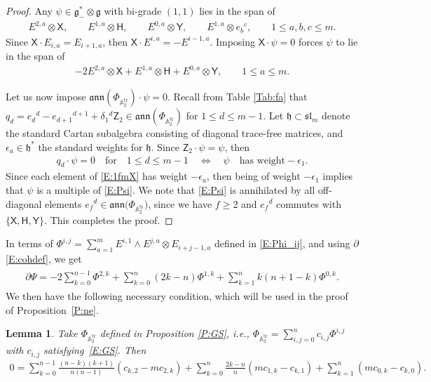 \documentclass[10pt,a4paper]{amsart}
\newcommand\tensor{\otimes}
\DeclareMathOperator{\tr}{tr}
\newcommand{\fh}{\mathfrak{h}}
\newcommand\fann{\mathfrak{ann}}
\newcommand\fg{\mathfrak{g}}
\newcommand\fsl{\mathfrak{sl}}
\newcommand\bbA{\mathbb{A}}
\newcommand\sfX{\mathsf{X}}
\newcommand\sfH{\mathsf{H}}
\newcommand\sfY{\mathsf{Y}}
\newcommand\sfZ{\mathsf{Z}}
\numberwithin{equation}{section}
\newtheorem{Lemma}[Theorem]{Lemma}
\begin{document}
\begin{proof}
 Any $\psi \in \fg_-^* \otimes \fg$ with bi-grade $(1,1)$ lies in the span of
\begin{align*}%
E^{2,a} \tensor \sfX, \qquad E^{1,a} \tensor \sfH,\qquad E^{0,a} \tensor \sfY, \qquad E^{1,a} \tensor e_b{}^c, \qquad 1 \le a,b,c \le m.
\end{align*}
Since $\sfX \cdot E_{i,a} = E_{i+1,a}$, then $\sfX \cdot E^{i,a} = -E^{i-1,a}$. Imposing $\sfX \cdot \psi = 0$ forces $\psi$ to lie in the span of
\begin{align} \label{E:1fmX}
-2 E^{2,a} \tensor \sfX + E^{1,a} \tensor \sfH + E^{0,a} \tensor \sfY, \qquad 1 \le a \le m.
\end{align}
	
Let us now impose $\fann(\Phi_{\bbA_2^{\tr}}) \cdot \psi = 0$. Recall from Table \ref{Tab:fa} that $q_d = e_d{}^d-e_{d+1}{}^{d+1} + \delta_1{}^d\sfZ_2 \in \fann(\Phi_{\bbA_2^{\tr}})$ for $1 \le d \le m-1$. Let $\fh \subset \fsl_m$ denote the standard Cartan subalgebra consisting of diagonal trace-free matrices, and $\epsilon_a \in \fh^*$ the standard weights for $\fh$. Since $\sfZ_2 \cdot \psi = \psi$, then
\begin{align*}
q_d \cdot \psi = 0 \quad \text{for}\quad 1 \le d \leq m-1 \quad\iff\quad \psi \quad \text{has weight} -\epsilon_1.
\end{align*}
Since each element of \eqref{E:1fmX} has weight $-\epsilon_a$, then being of weight $-\epsilon_1$ implies that $\psi$ is a multiple of \eqref{E:Psi}.	
We note that \eqref{E:Psi} is annihilated by all off-diagonal elements $e_f{}^d \in \fann\bigl(\Phi_{\bbA_2^{\tr}}\bigr)$, since we have $f \ge 2$ and $e_f{}^d$ commutes with $\{\sfX, \sfH, \sfY \}$. This completes the proof.
\end{proof}

 In terms of $\Phi^{i,j}= \sum_{a=1}^m E^{i,1} \wedge E^{j,a} \tensor E_{i+j-1,a}$ defined in \eqref{E:Phi_ij}, and using $\partial$ \eqref{E:cohdef}, we get
\begin{align} \label{E:dPsi}
\begin{split}
\partial \Psi = -2 \sum_{k=0}^{n-1} \Phi^{2,k} + \sum_{k=0}^n (2k-n) \Phi^{1,k} + \sum_{k=1}^n k(n+1-k)\Phi^{0,k}.
\end{split}
\end{align}
We then have the following necessary condition, which will be used in the proof of Proposition~\ref{P:ne}.
\begin{Lemma}\label{L:norm}
Take $\Phi_{\bbA_2^{\tr}}$ defined in Proposition {\rm \ref{P:GS}}, i.e., $\Phi_{\bbA_2^{\tr}} = \sum_{i,j=0}^nc_{i,j}\Phi^{i,j}$ with $c_{i,j}$ satisfying~\eqref{E:GS}. Then
\begin{align*}%
0 = \sum_{k=0}^{n-1} \frac{(n-k)(k+1)}{n(n-1)}(c_{k,2}-mc_{2,k})
+ \sum_{k=0}^{n} \frac{2k-n}{n} (mc_{1,k}-c_{k,1}) + \sum_{k=1}^n (mc_{0,k}-c_{k,0}).
\end{align*}
\end{Lemma}
\end{document}
